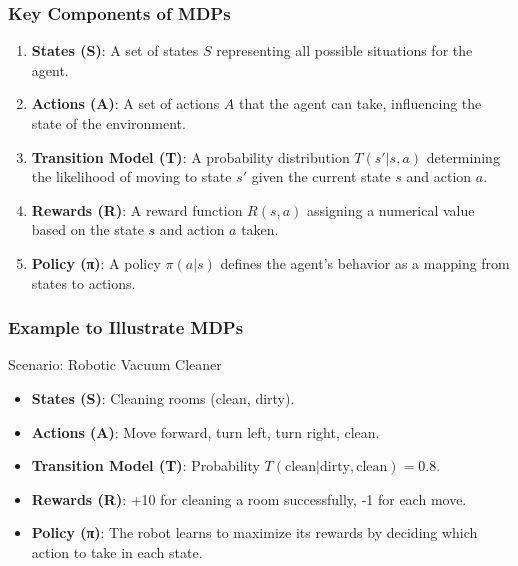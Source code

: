 \documentclass[aspectratio=169]{beamer}
\begin{document}
\begin{frame}[fragile]
    \frametitle{Key Components of MDPs}
    \begin{enumerate}
        \item \textbf{States (S)}: A set of states \( S \) representing all possible situations for the agent.
        \item \textbf{Actions (A)}: A set of actions \( A \) that the agent can take, influencing the state of the environment.
        \item \textbf{Transition Model (T)}: A probability distribution \( T(s'|s, a) \) determining the likelihood of moving to state \( s' \) given the current state \( s \) and action \( a \).
        \item \textbf{Rewards (R)}: A reward function \( R(s, a) \) assigning a numerical value based on the state \( s \) and action \( a \) taken.
        \item \textbf{Policy (π)}: A policy \( \pi(a|s) \) defines the agent's behavior as a mapping from states to actions.
    \end{enumerate}
\end{frame}

\begin{frame}[fragile]
    \frametitle{Example to Illustrate MDPs}
    \begin{block}{Scenario: Robotic Vacuum Cleaner}
        \begin{itemize}
            \item \textbf{States (S)}: Cleaning rooms (clean, dirty).
            \item \textbf{Actions (A)}: Move forward, turn left, turn right, clean.
            \item \textbf{Transition Model (T)}: Probability \( T(\text{clean}| \text{dirty}, \text{clean}) = 0.8 \).
            \item \textbf{Rewards (R)}: +10 for cleaning a room successfully, -1 for each move.
            \item \textbf{Policy (π)}: The robot learns to maximize its rewards by deciding which action to take in each state.
        \end{itemize}
    \end{block}
\end{frame}
\end{document}
